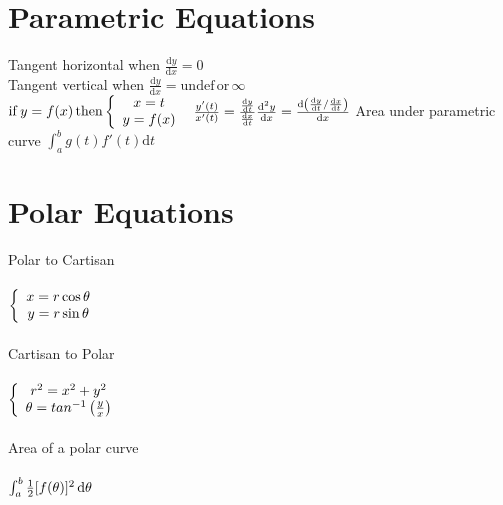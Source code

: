 \documentclass[11pt]{article} %
\begin{document}
\section{Parametric Equations}
Tangent horizontal when 
\begin{math}
\frac{\mathrm{d} y}{\mathrm{d} x} =0
\end{math} \\
Tangent vertical when 
\begin{math}
\frac{\mathrm{d} y}{\mathrm{d} x} = \mathrm{undef \, or} \, \infty
\end{math}
\\
\begin{math}
\mathrm{if} \, y=f(x)\, \mathrm{then} \left\{
\begin{array}{c l}     
    x=t\\
    y=f(x)
\end{array}\right. \\
\end{math}
\begin{math}
\frac{{y}'(t)}{{x}'(t)} = \frac{\frac{\mathrm{d} y}{\mathrm{d} t}}{\frac{\mathrm{d} x}{\mathrm{d} t}} \\
\\
\frac{\mathrm{d} ^{2} y}{\mathrm{d} x} = \frac{\mathrm{d} \left (\frac{\mathrm{d} y}{\mathrm{d} t}/{\frac{\mathrm{d} x}{\mathrm{d} t}} \right )}{\mathrm{d} x} \\
\end{math}
Area under parametric curve
\begin{math}
\int_{a}^{b} g(t){f}'(t) \mathrm{d}t
\end{math} \\
\section{Polar Equations}
Polar to Cartisan \\
\\
\begin{math}
\left\{
\begin{array}{c l}     
    x=r\cos \theta \\
    y=r\sin \theta
\end{array}\right. \\
\end{math} \\
\\
Cartisan to Polar \\
\\
\begin{math}
\left\{
\begin{array}{c l}     
    r^{2} = x^{2} + y^{2} \\
    \theta = tan^{-1}\left ( \frac{y}{x} \right )
\end{array}\right. \\
\end{math} \\
\\
Area of a polar curve \\
\\
\begin{math}
\int_{a}^{b} \frac{1}{2}[f(\theta)]^{2} \, \mathrm{d}\theta \\
\end{math}
\end{document}

